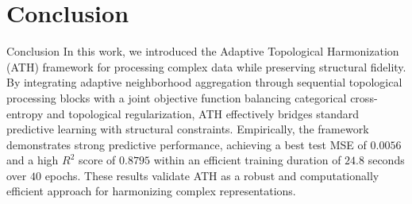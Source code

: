 \documentclass[10pt,twocolumn]{article}
\begin{document}
\section{Conclusion}
\begin{section}{Conclusion}
In this work, we introduced the Adaptive Topological Harmonization (ATH) framework for processing complex data while preserving structural fidelity. By integrating adaptive neighborhood aggregation through sequential topological processing blocks with a joint objective function balancing categorical cross-entropy and topological regularization, ATH effectively bridges standard predictive learning with structural constraints. Empirically, the framework demonstrates strong predictive performance, achieving a best test MSE of $0.0056$ and a high $R^2$ score of $0.8795$ within an efficient training duration of $24.8$ seconds over $40$ epochs. These results validate ATH as a robust and computationally efficient approach for harmonizing complex representations.
\end{section}



\end{document}
